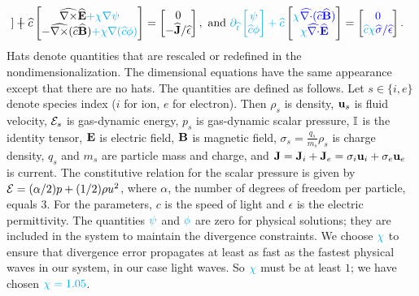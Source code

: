 \documentclass[12pt,fleqn]{article}
\numberwithin{equation}{section}
\begin{document}
\begin{gather*}
\begin{bmatrix}
    \end{bmatrix}
 + \widehat c
    \begin{bmatrix}
      \widehat{\nabla\times}\widehat{\mathbf{E}}{\color{cyan} +{\chi}\nabla\psi} \\
      -\widehat{\nabla\times}(\widehat c\widehat{\mathbf{B}}){\color{cyan} + {\chi}\nabla(\widehat c\phi)} \\
    \end{bmatrix}
 = \begin{bmatrix}
      0 \\
      -\widehat{\mathbf{J}}/{\widehat\epsilon} \\
    \end{bmatrix}, \hbox{ and }
 {\color{cyan}\partial_{\widehat t}
    \begin{bmatrix}
      {\color{cyan}\psi} \\
      {\color{cyan}\widehat c\phi} \\
    \end{bmatrix}
 + \widehat c
 }
    \begin{bmatrix}
       {\color{cyan}{\chi}{\color{blue}\widehat{\nabla\cdot}(\widehat c\widehat{\mathbf{B}})}} \\
       {\color{cyan} {\chi}{\color{blue}\widehat{\nabla\cdot}\widehat{\mathbf{E}}} } \\
    \end{bmatrix}
 = \begin{bmatrix}
      {\color{blue}0} \\
      {\color{cyan} \widehat c{\chi}{\color{blue} \widehat{\sigma}/\widehat\epsilon}} \\
    \end{bmatrix}.
\end{gather*}
Hats denote quantities that are rescaled or redefined
in the nondimensionalization.
The dimensional equations have the same appearance except that
there are no hats.
The quantities are defined as follows.
Let $s\in\{i,e\}$ denote species index 
($i$ for ion, $e$ for electron). Then
$\rho_s$ is density,
$\mathbf{u}_s$ is fluid velocity,
$\mathcal{E}_s$ is gas-dynamic energy,
$p_s$ is gas-dynamic scalar pressure,
$\mathbb{I}$ is the identity tensor,
$\mathbf{E}$ is electric field,
$\mathbf{B}$ is magnetic field,
$\sigma_s=\frac{q_s}{m_s}\rho_s$ is charge density,
$q_s$ and $m_s$ are particle mass and charge,
and
$\mathbf{J}=\mathbf{J}_i+\mathbf{J}_e=\sigma_i\mathbf{u}_i+\sigma_e\mathbf{u}_e$ is current.
The constitutive relation for the
scalar pressure is given by
$\mathcal{E}=(\alpha/2)p+(1/2)\rho u^2$,
where $\alpha$, the number of degrees of freedom
per particle, equals 3.
For the parameters,
$c$ is the speed of light and
$\epsilon$ is the electric permittivity.
The quantities $\color{cyan}\psi$ and $\color{cyan}\phi$ are zero
for physical solutions; they are included
in the system to maintain
the divergence constraints.  We choose
$\color{cyan}\chi$ to ensure that divergence error
propagates at least as fast as the fastest physical
waves in our system, in our case light waves.
So $\color{cyan}\chi$
must be at least $1$; we have chosen $\color{cyan}\chi=1.05$.
\end{document}
